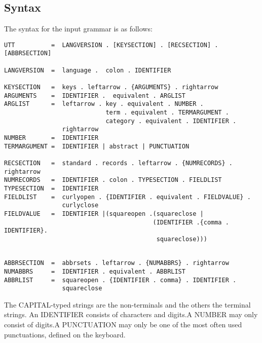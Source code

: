 \subsection{Syntax}
The syntax for the input grammar is as follows:
\begin{verbatim}
UTT          =  LANGVERSION . [KEYSECTION] . [RECSECTION] . [ABBRSECTION]

LANGVERSION  =  language .  colon . IDENTIFIER

KEYSECTION   =  keys . leftarrow . {ARGUMENTS} . rightarrow
ARGUMENTS    =  IDENTIFIER .  equivalent . ARGLIST
ARGLIST      =  leftarrow . key . equivalent . NUMBER .
                            term . equivalent . TERMARGUMENT .
                            category . equivalent . IDENTIFIER .
                rightarrow
NUMBER       =  IDENTIFIER
TERMARGUMENT =  IDENTIFIER | abstract | PUNCTUATION

RECSECTION   =  standard . records . leftarrow . {NUMRECORDS} . rightarrow
NUMRECORDS   =  IDENTIFIER . colon . TYPESECTION . FIELDLIST
TYPESECTION  =  IDENTIFIER
FIELDLIST    =  curlyopen . {IDENTIFIER . equivalent . FIELDVALUE} .
                curlyclose
FIELDVALUE   =  IDENTIFIER |(squareopen .(squareclose |
                                         (IDENTIFIER .{comma . IDENTIFIER}.
                                          squareclose)))
\end{verbatim}
\pagebreak
\begin{verbatim}

ABBRSECTION  =  abbrsets . leftarrow . {NUMABBRS} . rightarrow
NUMABBRS     =  IDENTIFIER . equivalent . ABBRLIST
ABBRLIST     =  squareopen . {IDENTIFIER . comma} . IDENTIFIER .
                squareclose

\end{verbatim}

The CAPITAL-typed strings are the non-terminals and the others the terminal strings.
An IDENTIFIER consists of characters and digits.A NUMBER may only consist of
digits.A PUNCTUATION may only be one of the most often used punctuations,
defined on the keyboard.

